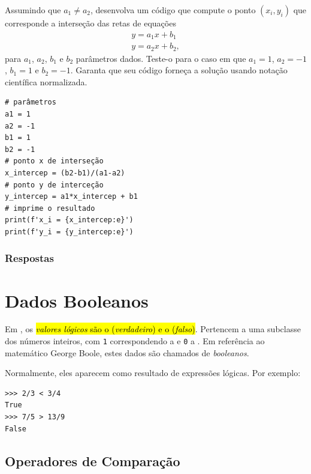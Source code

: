 \begin{exer}
  Assumindo que $a_1\neq a_2$, desenvolva um código {\python} que compute o ponto $(x_{i}, y_i)$ que corresponde a interseção das retas de equações
  \begin{gather}
    y = a_1x + b_1\\
    y = a_2x + b_2,
  \end{gather}
  para $a_1$, $a_2$, $b_1$ e $b_2$ parâmetros dados. Teste-o para o caso em que $a_1=1$, $a_2=-1$, $b_1=1$ e $b_2=-1$. Garanta que seu código forneça a solução usando notação científica normalizada.
\end{exer}
\begin{resp}

\begin{lstlisting}
# parâmetros
a1 = 1
a2 = -1
b1 = 1
b2 = -1
# ponto x de interseção
x_intercep = (b2-b1)/(a1-a2)
# ponto y de interceção
y_intercep = a1*x_intercep + b1
# imprime o resultado
print(f'x_i = {x_intercep:e}')
print(f'y_i = {y_intercep:e}')
\end{lstlisting}

\end{resp}

\ifisbook
\subsubsection{Respostas}
\shipoutAnswer
\fi

\section{Dados Booleanos}\label{cap_lingua_sec_bool}

Em {\python}, os \hl{\emph{valores lógicos} são o {\PYTHONTrue} (\emph{verdadeiro}) e o {\PYTHONFalse} (\emph{falso})}. Pertencem a uma subclasse dos números inteiros, com \lstinline+1+ correspondendo a {\PYTHONTrue} e \lstinline+0+ a {\PYTHONFalse}. Em referência ao matemático George Boole{\boole}, estes dados são chamados de \emph{booleanos}.

Normalmente, eles aparecem como resultado de expressões lógicas. Por exemplo:

\begin{lstlisting}
>>> 2/3 < 3/4
True
>>> 7/5 > 13/9
False
\end{lstlisting}

\subsection{Operadores de Comparação}

